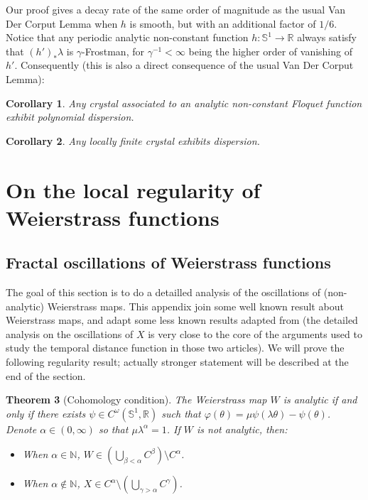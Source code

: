 \documentclass[11pt]{amsart}
\theoremstyle{plain}
\newtheorem{theorem}{Theorem}[section]
\newtheorem{corollary}[theorem]{Corollary}
\theoremstyle{definition}
\numberwithin{equation}{section}
\begin{document}
Our proof gives a decay rate of the same order of magnitude as the usual Van Der Corput Lemma when $h$ is smooth, but with an additional factor of $1/6$. Notice that any periodic analytic non-constant function $h : \mathbb{S}^1 \rightarrow \mathbb{R}$ always satisfy that $(h')_*\lambda$ is $\gamma$-Frostman, for $\gamma^{-1} < \infty$ being the higher order of vanishing of $h'$. Consequently (this is also a direct consequence of the usual Van Der Corput Lemma):

\begin{corollary}
Any crystal associated to an analytic non-constant Floquet function exhibit polynomial dispersion.
\end{corollary}

\begin{corollary}
    Any locally finite crystal exhibits dispersion.
\end{corollary}

\section{On the local regularity of Weierstrass functions}\label{ap:B}

\subsection{Fractal oscillations of Weierstrass functions} 

The goal of this section is to do a detailled analysis of the oscillations of (non-analytic) Weierstrass maps. This appendix join some well known result about Weierstrass maps, and adapt some less known results adapted from \cite{Leclerc2,TZ23} (the detailed analysis on the oscillations of $X$ is very close to the core of the arguments used to study the temporal distance function in those two articles). We will prove the following regularity result; actually stronger statement will be described at the end of the section.

\begin{theorem}[Cohomology condition]{\label{thm:regWeierstrass}}
The Weierstrass map $W$ is analytic if and only if there exists $\psi \in C^\omega(\mathbb{S}^1,\mathbb{R})$ such that $\varphi(\theta)=\mu \psi(\lambda \theta)-\psi(\theta)$. Denote $\alpha \in (0,\infty)$ so that $\mu \lambda^\alpha=1$. If $W$ is not analytic, then: \begin{itemize}
\item When $\alpha \in \mathbb{N}$,  $W \in (\bigcup_{\beta<\alpha} C^\beta) \setminus C^\alpha$.
\item When $\alpha \notin \mathbb{N}$, $X \in C^\alpha \setminus (\bigcup_{\gamma>\alpha} C^{\gamma})$.
\end{itemize}
\end{theorem}
\end{document}

